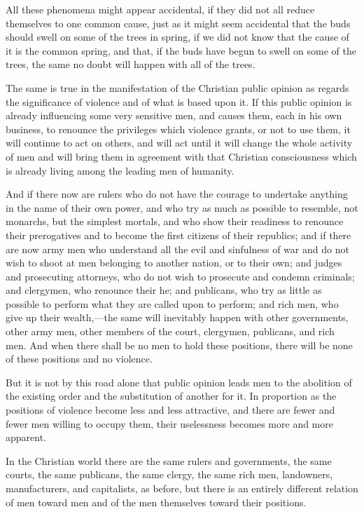 \documentclass{book}
\begin{document}
All these phenomena might appear accidental, if they did not all reduce themselves to one common cause, just as it might seem accidental that the buds should swell on some of the trees in spring, if we did not know that the cause of it is the common spring, and that, if the buds have begun to swell on some of the trees, the same no doubt will happen with all of the trees.

The same is true in the manifestation of the Christian public opinion as regards the significance of violence and of what is based upon it. If this public opinion is already influencing some very sensitive men, and causes them, each in his own business, to renounce the privileges which violence grants, or not to use them, it will continue to act on others, and will act until it will change the whole activity of men and will bring them in agreement with that Christian consciousness which is already living among the leading men of humanity.

And if there now are rulers who do not have the courage to undertake anything in the name of their own power, and who try as much as possible to resemble, not monarchs, but the simplest mortals, and who show their readiness to renounce their prerogatives and to become the first citizens of their republics; and if there are now army men who understand all the evil and sinfulness of war and do not wish to shoot at men belonging to another nation, or to their own; and judges and prosecuting attorneys, who do not wish to prosecute and condemn criminals; and clergymen, who renounce their he; and publicans, who try as little as possible to perform what they are called upon to perform; and rich men, who give up their wealth,—the same will inevitably happen with other governments, other army men, other members of the court, clergymen, publicans, and rich men. And when there shall be no men to hold these positions, there will be none of these positions and no violence.

But it is not by this road alone that public opinion leads men to the abolition of the existing order and the substitution of another for it. In proportion as the positions of violence become less and less attractive, and there are fewer and fewer men willing to occupy them, their uselessness becomes more and more apparent.

In the Christian world there are the same rulers and governments, the same courts, the same publicans, the same clergy, the same rich men, landowners, manufacturers, and capitalists, as before, but there is an entirely different relation of men toward men and of the men themselves toward their positions.
\end{document}

